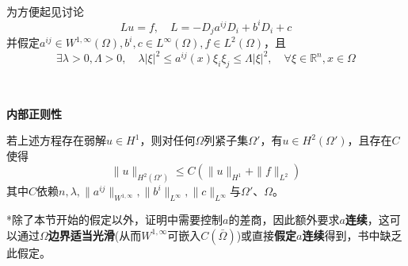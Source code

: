 \documentclass[a4paper,UTF8,fontset=windows,AutoFakeBold]{ctexart}
\begin{document}
\

为方便起见讨论
$$Lu=f,\quad L=-D_ja^{ij}D_i+b^iD_i+c$$
并假定$a^{ij}\in W^{1,\infty}(\Omega),b^i,c\in L^\infty(\Omega),f\in L^2(\Omega)$，且
$$\exists\lambda>0,\Lambda>0,\quad\lambda|\xi|^2\le a^{ij}(x)\xi_i\xi_j\le\Lambda|\xi|^2,\quad\forall\xi\in\mathbb{R}^n,x\in\Omega$$

\

\textbf{内部正则性}

若上述方程存在弱解$u\in H^1$，则对任何$\Omega$列紧子集$\Omega'$，有$u\in H^2(\Omega')$，且存在$C$使得
$$\|u\|_{H^2(\Omega')}\le C(\|u\|_{H^1}+\|f\|_{L^2})$$
其中$C$依赖$n,\lambda,\|a^{ij}\|_{W^{1,\infty}},\|b^i\|_{L^\infty},\|c\|_{L^\infty}$与$\Omega'$、$\Omega$。

*除了本节开始的假定以外，证明中需要控制$a$的差商，因此额外要求$a$\textbf{连续}，这可以通过$\Omega$\textbf{边界适当光滑}(从而$W^{1,\infty}$可嵌入$C(\bar\Omega)$)或直接\textbf{假定$a$连续}得到，书中缺乏此假定。
\end{document}
